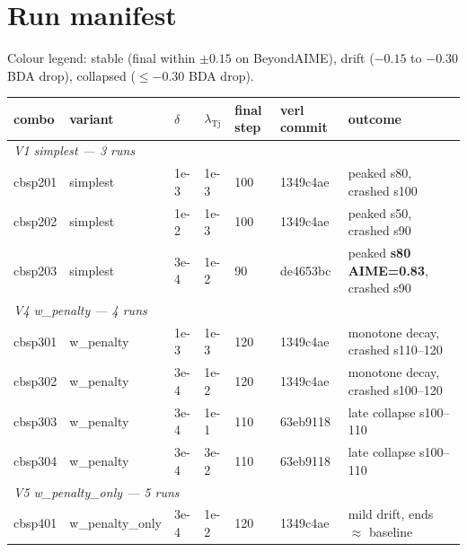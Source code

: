 \documentclass[10pt]{article}
\newcommand{\collapsed}{\cellcolor{red!25}}
\newcommand{\stable}{\cellcolor{green!20}}
\begin{document}
\section{Run manifest}

Colour legend:
\colorbox{green!20}{stable} (final within $\pm 0.15$ on BeyondAIME),
\colorbox{yellow!25}{drift} ($-0.15$ to $-0.30$ BDA drop),
\colorbox{red!25}{collapsed} ($\le -0.30$ BDA drop).

\begin{center}
\small
\begin{tabular}{lllllll}
\toprule
combo   & variant            & $\delta$ & $\lambda_{\mathrm{Tj}}$ & final step & verl commit & outcome \\
\midrule
\multicolumn{7}{l}{\emph{V1 simplest --- 3 runs}} \\
cbsp201 & simplest           & 1e-3     & 1e-3                    & 100        & 1349c4ae    & \collapsed peaked s80, crashed s100 \\
cbsp202 & simplest           & 1e-2     & 1e-3                    & 100        & 1349c4ae    & \collapsed peaked s50, crashed s90  \\
cbsp203 & simplest           & 3e-4     & 1e-2                    &  90        & de4653bc    & \collapsed peaked \textbf{s80 AIME=0.83}, crashed s90 \\
\midrule
\multicolumn{7}{l}{\emph{V4 w\_penalty --- 4 runs}} \\
cbsp301 & w\_penalty         & 1e-3     & 1e-3                    & 120        & 1349c4ae    & \collapsed monotone decay, crashed s110--120 \\
cbsp302 & w\_penalty         & 3e-4     & 1e-2                    & 120        & 1349c4ae    & \collapsed monotone decay, crashed s100--120 \\
cbsp303 & w\_penalty         & 3e-4     & 1e-1                    & 110        & 63eb9118    & \collapsed late collapse s100--110 \\
cbsp304 & w\_penalty         & 3e-4     & 3e-2                    & 110        & 63eb9118    & \collapsed late collapse s100--110 \\
\midrule
\multicolumn{7}{l}{\emph{V5 w\_penalty\_only --- 5 runs}} \\
cbsp401 & w\_penalty\_only   & 3e-4     & 1e-2                    & 120        & 1349c4ae    & \stable    mild drift, ends $\approx$ baseline \\

\end{tabular}
\end{center}
\end{document}
